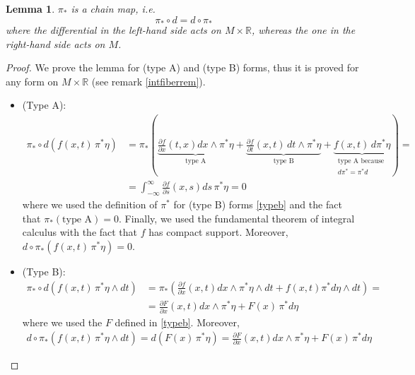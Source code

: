 \documentclass[a4paper,11pt,titlepage, article, oneside]{memoir}
\numberwithin{equation}{section}
\newtheorem{lemma}[theorem]{Lemma}
\theoremstyle{definition}
\theoremstyle{remark}
\newcommand{\rfield}{\mathbb{R}}
\newcommand{\defonde}[2]{\frac{\partial {#1}}{\partial {#2}}}
\begin{document}
\begin{lemma} \label{pichain}
$\pi_*$ is a chain map, i.e.
\begin{equation}
\pi_* \circ d  = d \circ \pi_*
\end{equation}
where the differential in the left-hand side acts on $M \times \rfield$, whereas the one in the right-hand side acts on $M$.
\end{lemma}
\begin{proof}
We prove the lemma for (type A) and (type B) forms, thus it is proved for any form on $M \times \rfield$ (see remark \ref{intfiberrem}).
\begin{itemize}
\item(Type A):
\begin{align*}
\pi_* \circ d \left ( f(x, t) \,\pi^* \eta \right ) &= \pi_* \left ( \underbrace{\defonde{f}{x}(t, x) dx \wedge \pi^* \eta}_{\text{type A}} + \underbrace{\defonde{f}{t}(x, t)\, dt \wedge \pi^* \eta}_{\text{type B}} + \underbrace{f(x, t) \, d\pi^* \eta}_{\substack{\text{type A because } \\ d\pi^*=\pi^*d}} \right ) = \\
&=\int_{-\infty}^{\infty} \defonde{f}{s}(x, s) ds \, \pi^* \eta = 0
\end{align*}
where we used the definition of $\pi^*$ for (type B) forms \eqref{typeb} and  the fact that $\pi_*(\text{type A}) = 0$. Finally, we used the fundamental theorem of integral calculus with the fact that $f$ has compact support.
Moreover, $d \circ \pi_*( f(x, t) \, \pi^*\eta) = 0$.
\item(Type B):
\begin{align*}
\pi_* \circ d (f(x, t) \, \pi^* \eta \wedge dt) &= \pi_* \left ( \defonde{f}{x} (x, t) dx \wedge \pi^*\eta \wedge dt + f(x, t) \pi^* d\eta \wedge dt \right)  = \\  
&=\defonde{F}{x}(x, t)dx \wedge \pi^* \eta + F(x) \, \pi^* d\eta 
\end{align*}
where we used the $F$ defined in \eqref{typeb}.
Moreover,
\begin{align*}
d \circ \pi_* (f(x, t) \, \pi^* \eta \wedge dt) = d(F(x)\, \pi^*\eta) = \defonde{F}{x}(x, t)dx \wedge \pi^* \eta + F(x) \, \pi^* d\eta 
\end{align*}
\end{itemize}
\end{proof}
\end{document}
